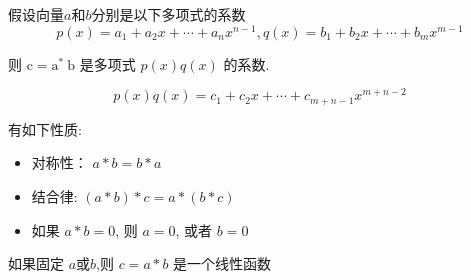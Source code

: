 \begin{example}
\end{example}

\begin{corollary}
    假设向量$a$和$b$分别是以下多项式的系数
    $$ p(x)=a_{1}+a_{2} x+\cdots+a_{n} x^{n-1}, q(x)=b_{1}+b_{2} x+\cdots+b_{m} x^{m-1} $$

    则 $ \mathrm{c}=\mathrm{a}^{*} \mathrm{~b} $ 是多项式 $ p(x) q(x) $ 的系数.

    $$ p(x) q(x)=c_{1}+c_{2} x+\cdots+c_{m+n-1} x^{m+n-2} $$
\end{corollary}

\begin{corollary}[卷积性质]
    有如下性质:
    \begin{itemize}
        \item 对称性： $ a * b=b * a $
        \item 结合律: $ (a * b) * c=a *(b * c) $
        \item 如果 $ a * b=0 $, 则 $ a=0 $, 或者 $ b=0 $
    \end{itemize}
\end{corollary}

\begin{corollary}
    如果固定 $ a $或$b$,则 $ c=a * b $ 是一个线性函数
\end{corollary}

